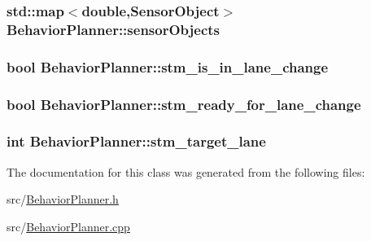 \subsubsection[{\texorpdfstring{sensor\+Objects}{sensorObjects}}]{\setlength{\rightskip}{0pt plus 5cm}std\+::map$<$double,{\bf Sensor\+Object}$>$ Behavior\+Planner\+::sensor\+Objects}\hypertarget{classBehaviorPlanner_a0e7463db7467db3a4fe2e5eff7490d90}{}\label{classBehaviorPlanner_a0e7463db7467db3a4fe2e5eff7490d90}
\subsubsection[{\texorpdfstring{stm\+\_\+is\+\_\+in\+\_\+lane\+\_\+change}{stm_is_in_lane_change}}]{\setlength{\rightskip}{0pt plus 5cm}bool Behavior\+Planner\+::stm\+\_\+is\+\_\+in\+\_\+lane\+\_\+change\hspace{0.3cm}{\ttfamily [protected]}}\hypertarget{classBehaviorPlanner_aec3a75f12f6776616f4ecb275a975892}{}\label{classBehaviorPlanner_aec3a75f12f6776616f4ecb275a975892}
\subsubsection[{\texorpdfstring{stm\+\_\+ready\+\_\+for\+\_\+lane\+\_\+change}{stm_ready_for_lane_change}}]{\setlength{\rightskip}{0pt plus 5cm}bool Behavior\+Planner\+::stm\+\_\+ready\+\_\+for\+\_\+lane\+\_\+change\hspace{0.3cm}{\ttfamily [protected]}}\hypertarget{classBehaviorPlanner_a78e0c9212796e8949f7f44bd34f47107}{}\label{classBehaviorPlanner_a78e0c9212796e8949f7f44bd34f47107}
\subsubsection[{\texorpdfstring{stm\+\_\+target\+\_\+lane}{stm_target_lane}}]{\setlength{\rightskip}{0pt plus 5cm}int Behavior\+Planner\+::stm\+\_\+target\+\_\+lane\hspace{0.3cm}{\ttfamily [protected]}}\hypertarget{classBehaviorPlanner_a10df7163fdc6a3830a63cdf8a76b9359}{}\label{classBehaviorPlanner_a10df7163fdc6a3830a63cdf8a76b9359}


The documentation for this class was generated from the following files\+:\begin{DoxyCompactItemize}
\item 
src/\hyperlink{BehaviorPlanner_8h}{Behavior\+Planner.\+h}\item 
src/\hyperlink{BehaviorPlanner_8cpp}{Behavior\+Planner.\+cpp}\end{DoxyCompactItemize}
